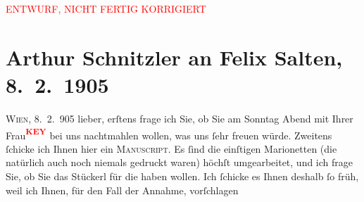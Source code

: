 
\begin{center}
            \textcolor{red}{ENTWURF, NICHT FERTIG KORRIGIERT}
                      \end{center}
            
         
         \newcommand{\erwaehntePersonen}{Personen: Felix Salten}
         \newcommand{\erwaehnteOrte}{Orte: Wien}
         \newcommand{\erwaehnteWerke}{Werke: Die Zeit, Zum großen Wurstel}
               \section[Arthur Schnitzler an Felix Salten, 8. 2. 1905]{ Arthur Schnitzler an Felix Salten, 8. 2. 1905}\nopagebreak{}\rehead{ }\begin{ledgroupsized}[t]{13cm}\normalsize\beginnumbering \toendnotes[C]{\smallbreak\pagebreak[2]} 
\toendnotes[C]{\smallbreak}\pstart
           \raggedleft{}\textsc{{\pb}Wien}, 8. 2. 905\pend
           \pstart{}lieber,\pend\pstart
           erſtens frage ich Sie, ob Sie am Sonntag Abend mit Ihrer Frau\textcolor{red}{\textsuperscript{\textbf{KEY}}} bei uns nachtmahlen wollen, was
               uns ſehr freuen würde. \pend
           \pstart
           Zweitens ſchicke ich Ihnen hier ein \textsc{Manuscript}. Es ſind die einſtigen Marionetten (die natürlich
               auch noch niemals gedruckt waren) höchſt umgearbeitet, und ich frage Sie, ob Sie das
               Stückerl für die \label{K_L02997-1v}\label{K_L02997-1h} haben wollen. Ich ſchicke es
               Ihnen deshalb ſo früh, weil ich Ihnen, für {\pb}den Fall der Annahme, vorſchlagen

\end{ledgroupsized}
